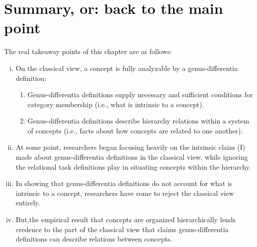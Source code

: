 \section{Summary, or: back to the main point}

The real takeaway points of this chapter are as follows:

\begin{enumerate}[(i)]
\item On the classical view, a concept is fully analyzable by a genus-differentia definition:
	\begin{enumerate}
	\item Genus-differentia definitions supply necessary and sufficient conditions for category membership (i.e., what is intrinsic to a concept).
	\item Genus-differentia definitions describe hierarchy relations within a system of concepts (i.e., facts about how concepts are related to one another).
	\end{enumerate}
\item At some point, researchers began focusing heavily on the intrinsic claim (I) made about genus-differentia definitions in the classical view, while ignoring the relational task definitions play in situating concepts within the hierarchy.
\item In showing that genus-differentia definitions do not account for what is intrinsic to a concept, researchers have come to reject the classical view entirely.
\item But,the empirical result that concepts are organized hierarchically lends credence to the part of the classical view that claims genus-differentia definitions can describe relations between concepts.
\end{enumerate}


\clearpage
